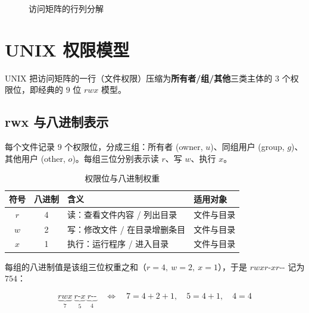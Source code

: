\begin{figure}[H]
\centering
{}
\caption{访问矩阵的行列分解}
\end{figure}

\section{UNIX 权限模型}

UNIX 把访问矩阵的一行（文件权限）压缩为\textbf{所有者/组/其他}三类主体的 $3$ 个权限位，即经典的 $9$ 位 $rwx$ 模型。

\subsection{rwx 与八进制表示}

每个文件记录 $9$ 个权限位，分成三组：所有者 (owner, $u$)、同组用户 (group, $g$)、其他用户 (other, $o$)。每组三位分别表示读 $r$、写 $w$、执行 $x$。

\begin{table}[H]
\centering
\caption{权限位与八进制权重}
\begin{tabulary}{\textwidth}{CCLL}
\toprule
符号 & 八进制 & 含义 & 适用对象 \\
\midrule
$r$ & 4 & 读：查看文件内容 / 列出目录 & 文件与目录 \\
$w$ & 2 & 写：修改文件 / 在目录增删条目 & 文件与目录 \\
$x$ & 1 & 执行：运行程序 / 进入目录 & 文件与目录 \\
\bottomrule
\end{tabulary}
\end{table}

\noindent 每组的八进制值是该组三位权重之和（$r{=}4,\ w{=}2,\ x{=}1$），于是 $rwxr\text{-}xr\text{-}\text{-}$ 记为 $754$：

\begin{equation}
    \underbrace{rwx}_{7}\ \underbrace{r\text{-}x}_{5}\ \underbrace{r\text{-}\text{-}}_{4}
    \quad\Longleftrightarrow\quad 7 = 4+2+1,\quad 5 = 4+1,\quad 4 = 4
\end{equation}

